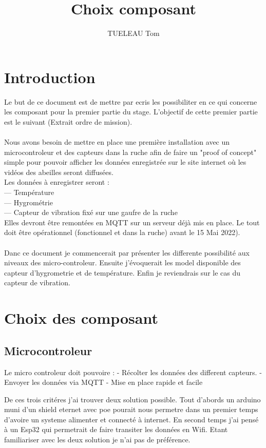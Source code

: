 \documentclass[5pt]{article}
\title{Choix composant}
\author{TUELEAU Tom}
\begin{document}
\maketitle

\section{Introduction}

Le but de ce document est de mettre par ecris les possibiliter en ce qui concerne les composant pour la premier partie du stage. L'objectif de cette premier partie est le suivant (Extrait ordre de mission).\\ 
\\
Nous avons besoin de mettre en place une première installation avec un microcontroleur et
des capteurs dans la ruche afin de faire un "proof of concept" simple pour pouvoir afficher les
données enregistrée sur le site internet où les vidéos des abeilles seront diffusées.\\
Les données à enregistrer seront :\\
— Température\\
— Hygrométrie\\
— Capteur de vibration fixé sur une gaufre de la ruche\\
Elles devront être remontées en MQTT sur un serveur déjà mis en place.
Le tout doit être opérationnel (fonctionnel et dans la ruche) avant le 15 Mai 2022).
\\
\\
Danc ce document je commencerait par présenter les differente possibilité aux niveaux des micro-controleur. Ensuite j'évoquerait les model disponible des capteur d'hygrometrie et de température. Enfin je reviendrais sur le cas du capteur de vibration.

\newpage{}
\section{Choix des composant}

\subsection{Microcontroleur}
Le micro controleur doit pouvoire :
	- Récolter les données des different capteurs.
	- Envoyer les données via MQTT
	- Mise en place rapide et facile

De ces trois critéres j'ai trouver deux solution possible. 
Tout d'abords un arduino muni d'un shield eternet avec poe pourait nous permetre dans un premier temps d'avoire un systeme alimenter et connecté à internet. 
En second temps j'ai pensé à un Esp32 qui permetrait de faire transiter les données en Wifi. 
Etant familiariser avec les deux solution je n'ai pas de préférence.
\end{document}
